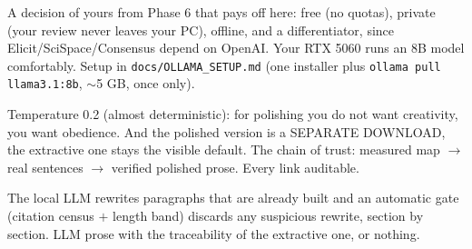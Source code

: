 \documentclass[11pt,a4paper]{article}
\begin{document}
A decision of yours from Phase 6 that pays off here: free (no quotas), private (your review
never leaves your PC), offline, and a differentiator, since Elicit/SciSpace/Consensus depend on
OpenAI. Your RTX 5060 runs an 8B model comfortably. Setup in
\texttt{docs/OLLAMA\_SETUP.md} (one installer plus \texttt{ollama pull llama3.1:8b},
$\sim$5 GB, once only).

\begin{ojo}
Temperature 0.2 (almost deterministic): for polishing you do not want creativity, you want
obedience. And the polished version is a SEPARATE DOWNLOAD, the extractive one stays the
visible default. The chain of trust: measured map $\rightarrow$ real sentences $\rightarrow$
verified polished prose. Every link auditable.
\end{ojo}

\begin{resumen}
The local LLM rewrites paragraphs that are already built and an automatic gate (citation census
$+$ length band) discards any suspicious rewrite, section by section. LLM prose with the
traceability of the extractive one, or nothing.
\end{resumen}
\end{document}
